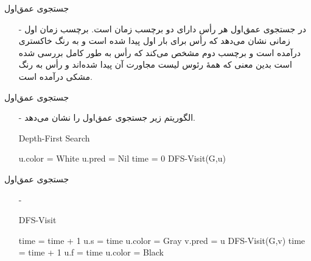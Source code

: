 \begin{frame}{‌جستجوی عمق‌اول}
\begin{itemize}\itemr
\item[-]
در جستجوی عمق‌اول هر رأس دارای دو برچسب زمان
است. برچسب زمان اول
زمانی نشان می‌دهد که رأس برای بار اول پیدا شده است و به رنگ خاکستری درآمده است و برچسب دوم
مشخص می‌کند که رأس
به طور کامل بررسی شده است بدین معنی که همهٔ رئوس لیست مجاورت آن پیدا شده‌اند و رأس
به رنگ مشکی درآمده است.
\end{itemize}
\end{frame}


\begin{frame}{‌جستجوی عمق‌اول}
\begin{itemize}\itemr
\item[-]
الگوریتم زیر جستجوی عمق‌اول را نشان می‌دهد.
\begin{algorithm}[H]\alglr
  \caption{Depth-First Search} 
  \begin{algorithmic}[1]
   			\State u.color = White
   			\State u.pred = Nil
   	\EndFor
   	\State time = 0
   					\State DFS-Visit(G,u)
   			\EndIf
   	\EndFor                           
  \end{algorithmic}
  \label{alg:merge}
\end{algorithm}
\end{itemize}
\end{frame}


\begin{frame}{‌جستجوی عمق‌اول}
\begin{itemize}\itemr
\item[-]
\begin{algorithm}[H]\alglr
  \caption{DFS-Visit} 
  \begin{algorithmic}[1]
   \State time = time + 1		
   \State u.s = time
   \State u.color = Gray
   		
   				\State v.pred = u
   				\State DFS-Visit(G,v)
   		\EndIf
   \EndFor
   \State time = time + 1
   \State u.f = time
   \State u.color = Black                              
  \end{algorithmic}
  \label{alg:merge}
\end{algorithm}
\end{itemize}
\end{frame}


